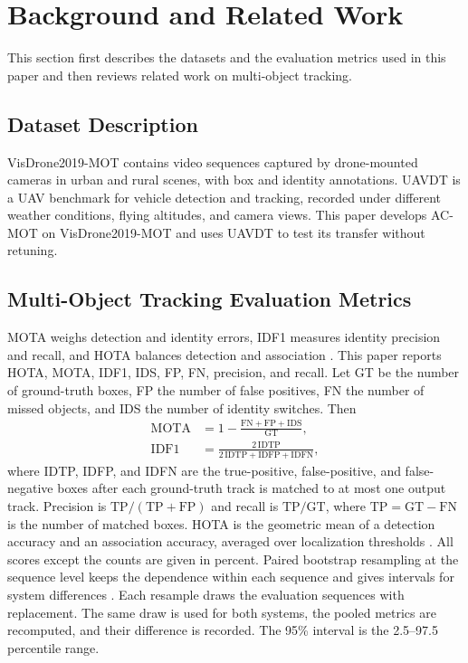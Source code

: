 \documentclass[pdflatex,sn-mathphys-num,iicol]{sn-jnl}
\begin{document}
\section{Background and Related Work}\label{sec:related}
This section first describes the datasets and the evaluation metrics used in
this paper and then reviews related work on multi-object tracking.

\subsection{Dataset Description}\label{sec:datasets}
VisDrone2019-MOT \cite{zhu2022visdrone} contains video sequences captured by
drone-mounted cameras in urban and rural scenes, with box and identity
annotations. UAVDT \cite{du2018uavdt} is a UAV benchmark for vehicle detection
and tracking, recorded under different weather conditions, flying altitudes,
and camera views. This paper develops AC-MOT on VisDrone2019-MOT and uses
UAVDT to test its transfer without retuning.

\subsection{Multi-Object Tracking Evaluation Metrics}\label{sec:metrics}
MOTA weighs detection and identity errors, IDF1 measures identity precision
and recall, and HOTA balances detection and association \cite{luiten2021hota}.
This paper reports HOTA, MOTA, IDF1, IDS, FP, FN, precision, and recall.
Let GT be the number of ground-truth boxes, FP the number of false positives,
FN the number of missed objects, and IDS the number of identity switches. Then
\begin{align}
\mathrm{MOTA}&=1-\frac{\mathrm{FN}+\mathrm{FP}+\mathrm{IDS}}{\mathrm{GT}},\label{eq:mota}\\
\mathrm{IDF1}&=\frac{2\,\mathrm{IDTP}}{2\,\mathrm{IDTP}+\mathrm{IDFP}+\mathrm{IDFN}},\label{eq:idf1}
\end{align}
where IDTP, IDFP, and IDFN are the true-positive, false-positive, and
false-negative boxes after each ground-truth track is matched to at most one
output track. Precision is $\mathrm{TP}/(\mathrm{TP}+\mathrm{FP})$ and recall
is $\mathrm{TP}/\mathrm{GT}$, where $\mathrm{TP}=\mathrm{GT}-\mathrm{FN}$ is
the number of matched boxes. HOTA is the geometric mean of a detection accuracy
and an association accuracy, averaged over localization thresholds
\cite{luiten2021hota}. All scores except the counts are given in percent.
Paired bootstrap resampling at the sequence level keeps the dependence within
each sequence and gives intervals for system differences
\cite{efron1993bootstrap}. Each resample draws the evaluation sequences with
replacement. The same draw is used for both systems, the pooled metrics are
recomputed, and their difference is recorded. The 95\% interval is the
2.5--97.5 percentile range.
\end{document}
